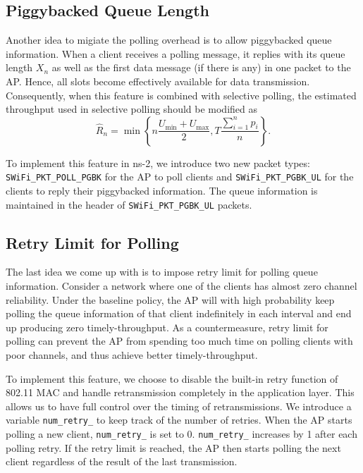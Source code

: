 \documentclass{article}
\begin{document}
\subsection{Piggybacked Queue Length}

Another idea to migiate the polling overhead is to allow piggybacked queue information. When a client receives a polling message, it replies with its queue length $X_n$ as well as the first data message (if there is any) in one packet to the AP. Hence, all slots become effectively available for data transmission. Consequently, when this feature is combined with selective polling, the estimated throughput used in selective polling should be modified as
\[
\hat{R}_n = \min \left\{n\frac{U_{\min}+U_{\max}}{2}, T \frac{\sum_{i=1}^{n}p_i}{n} \right\}.
\]

To implement this feature in ns-2, we introduce two new packet types: \lstinline|SWiFi_PKT_POLL_PGBK| for the AP to poll clients and \lstinline|SWiFi_PKT_PGBK_UL| for the clients to reply their piggybacked information. The queue information is maintained in the header of \lstinline|SWiFi_PKT_PGBK_UL| packets.

\subsection{Retry Limit for Polling}

The last idea we come up with is to impose retry limit for polling queue information.
Consider a network where one of the clients has almost zero channel reliability. Under the baseline policy, the AP will with high probability keep polling the queue information of that client indefinitely in each interval and end up producing zero timely-throughput. As a countermeasure, retry limit for polling can prevent the AP from spending too much time on polling clients with poor channels, and thus achieve better timely-throughput.

To implement this feature, we choose to disable the built-in retry function of 802.11 MAC and handle retransmission completely in the application layer. This allows us to have full control over the timing of retransmissions. We introduce a variable \lstinline|num_retry_| to keep track of the number of retries. When the AP starts polling a new client, \lstinline|num_retry_| is set to 0. \lstinline|num_retry_| increases by 1 after each polling retry. If the retry limit is reached, the AP then starts polling the next client regardless of the result of the last transmission.
\end{document}
